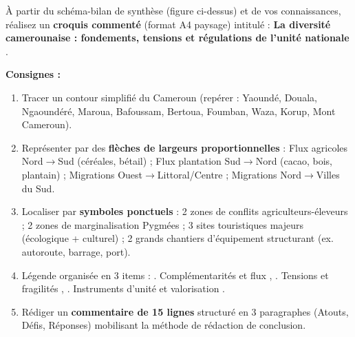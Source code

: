 \documentclass[11pt]{article}
\begin{document}
\begin{exercice}
À partir du schéma-bilan de synthèse (figure ci-dessus) et de vos connaissances, réalisez un \textbf{croquis commenté} (format A4 paysage) intitulé : \og \textbf{La diversité camerounaise : fondements, tensions et régulations de l'unité nationale} \fg.
\par
\textbf{Consignes :}
\begin{enumerate}
    \item Tracer un contour simplifié du Cameroun (repérer : Yaoundé, Douala, Ngaoundéré, Maroua, Bafoussam, Bertoua, Foumban, Waza, Korup, Mont Cameroun).
    \item Représenter par des \textbf{flèches de largeurs proportionnelles} : Flux agricoles Nord$\to$Sud (céréales, bétail) ; Flux plantation Sud$\to$Nord (cacao, bois, plantain) ; Migrations Ouest$\to$Littoral/Centre ; Migrations Nord$\to$Villes du Sud.
    \item Localiser par \textbf{symboles ponctuels} : 2 zones de conflits agriculteurs-éleveurs ; 2 zones de marginalisation Pygmées ; 3 sites touristiques majeurs (écologique + culturel) ; 2 grands chantiers d'équipement structurant (ex. autoroute, barrage, port).
    \item Légende organisée en 3 items : . Complémentarités et flux \fg, . Tensions et fragilités \fg, . Instruments d'unité et valorisation \fg.
    \item Rédiger un \textbf{commentaire de 15 lignes} structuré en 3 paragraphes (Atouts, Défis, Réponses) mobilisant la méthode de rédaction de conclusion.
\end{enumerate}
\end{exercice}
\end{document}
